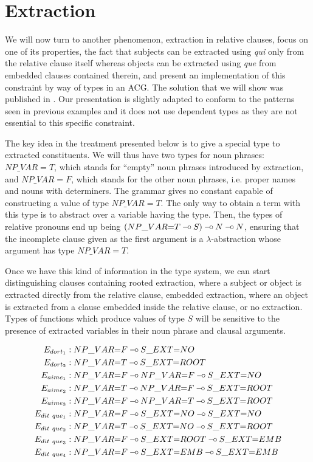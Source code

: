 \section{Extraction}
\label{sec:extraction}

We will now turn to another phenomenon, extraction in relative clauses,
focus on one of its properties, the fact that subjects can be extracted
using \emph{qui} only from the relative clause itself whereas objects
can be extracted using \emph{que} from embedded clauses contained
therein, and present an implementation of this constraint by way of
types in an ACG. The solution that we will show was published in
\cite{pogodalla2012controlling}. Our presentation is slightly adapted to
conform to the patterns seen in previous examples and it does not use
dependent types as they are not essential to this specific constraint.

The key idea in the treatment presented below is to give a special type
to extracted constituents. We will thus have two types for noun phrases:
$NP\_VAR{=}T$, which stands for ``empty'' noun phrases introduced by
extraction, and $NP\_VAR{=}F$, which stands for the other noun phrases,
i.e.  proper names and nouns with determiners. The grammar gives no
constant capable of constructing a value of type $NP\_VAR{=}T$. The only
way to obtain a term with this type is to abstract over a variable
having the type. Then, the types of relative pronouns end up being
$(NP\_VAR{=}T \mathbin{{-}\mkern-3.5mu{\circ}} S) \mathbin{{-}\mkern-3.5mu{\circ}} N \mathbin{{-}\mkern-3.5mu{\circ}} N$, ensuring that the incomplete
clause given as the first argument is a $\lambda$-abstraction whose
argument has type $NP\_VAR{=}T$.

Once we have this kind of information in the type system, we can start
distinguishing clauses containing rooted extraction, where a subject or
object is extracted directly from the relative clause, embedded
extraction, where an object is extracted from a clause embedded inside
the relative clause, or no extraction. Types of functions which produce
values of type $S$ will be sensitive to the presence of extracted
variables in their noun phrase and clausal arguments.

\begin{align*}
E_{dort_1} &: NP\_VAR{=}F \limp S\_EXT{=}NO \\
E_{dort_2} &: NP\_VAR{=}T \limp S\_EXT{=}ROOT \\
E_{aime_1} &: NP\_VAR{=}F \limp NP\_VAR{=}F \limp S\_EXT{=}NO \\
E_{aime_2} &: NP\_VAR{=}T \limp NP\_VAR{=}F \limp S\_EXT{=}ROOT \\
E_{aime_3} &: NP\_VAR{=}F \limp NP\_VAR{=}T \limp S\_EXT{=}ROOT \\
E_{dit\ que_1} &: NP\_VAR{=}F \limp S\_EXT{=}NO \limp S\_EXT{=}NO \\
E_{dit\ que_2} &: NP\_VAR{=}T \limp S\_EXT{=}NO \limp S\_EXT{=}ROOT \\
E_{dit\ que_3} &: NP\_VAR{=}F \limp S\_EXT{=}ROOT \limp S\_EXT{=}EMB \\
E_{dit\ que_4} &: NP\_VAR{=}F \limp S\_EXT{=}EMB \limp S\_EXT{=}EMB
\end{align*}

